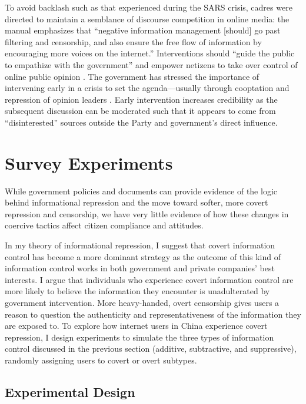 \documentclass[11pt]{article}
\begin{document}
To avoid backlash such as that experienced during the SARS crisis, cadres were directed to maintain a semblance of discourse competition in online media: the manual emphasizes that ``negative information management [should] go past filtering and censorship, and also ensure the free flow of information by encouraging more voices on the internet.'' Interventions should ``guide the public to empathize with the government'' and empower netizens to take over control of online public opinion \citep[12-15]{zou2015wangluo}. The government has stressed the importance of intervening early in a crisis to set the agenda---usually through cooptation and repression of opinion leaders \citep[180-194][]{zeng2015wangluo,zhou2011weibo}. Early intervention increases credibility as the subsequent discussion can be moderated such that it appears to come from ``disinterested'' sources outside the Party and government's direct influence.

\section{Survey Experiments}

While government policies and documents can provide evidence of the logic behind informational repression and the move toward softer, more covert repression and censorship, we have very little evidence of how these changes in coercive tactics affect citizen compliance and attitudes.

In my theory of informational repression, I suggest that covert information control has become a more dominant strategy as the outcome of this kind of information control works in both government and private companies' best interests. I argue that individuals who experience covert information control are more likely to believe the information they encounter is unadulterated by government intervention. More heavy-handed, overt censorship gives users a reason to question the authenticity and representativeness of the information they are exposed to. To explore how internet users in China experience covert repression, I design experiments to simulate the three types of information control discussed in the previous section (additive, subtractive, and suppressive), randomly assigning users to covert or overt subtypes.

\subsection{Experimental Design}
\end{document}
